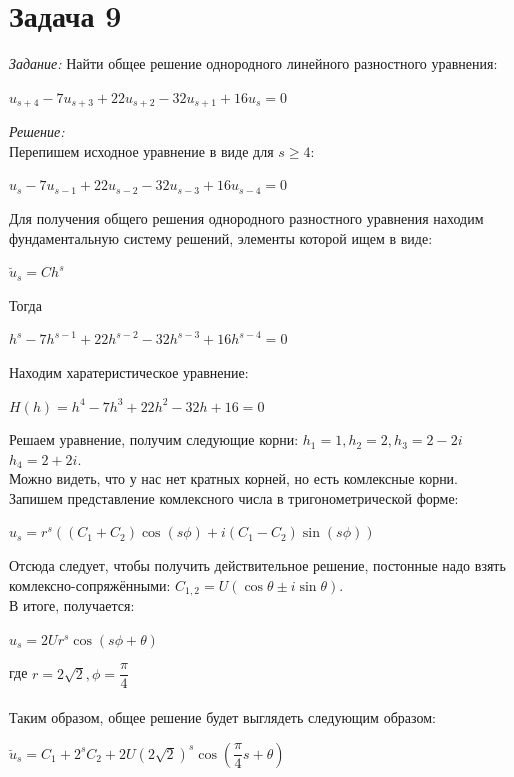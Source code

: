 \documentclass[14pt,fleqn]{extarticle}
\begin{document}
	\section*{Задача 9}
	\textit{Задание:} Найти общее решение однородного линейного разностного уравнения:
	\begin{center}
		$u_{s+4} - 7u_{s+3} + 22u_{s+2} - 32u_{s+1} + 16u_s = 0$
	\end{center}

	\textit{Решение:}\\
	Перепишем исходное уравнение в виде для $s \geq 4$:
	\begin{center}
		$u_{s} - 7u_{s-1} + 22u_{s-2} - 32u_{s-3} + 16u_{s-4} = 0$
	\end{center}
	Для получения общего решения однородного разностного уравнения находим фундаментальную систему решений, элементы которой ищем в виде:
	\begin{center}
		$\breve{u}_s = Ch^s$
	\end{center}
	Тогда
	\begin{center}
		$h^s - 7h^{s-1} + 22h^{s-2} - 32h^{s-3} + 16h^{s-4} = 0$
	\end{center}
	Находим харатеристическое уравнение:
	\begin{center}
		$H(h) = h^4 - 7h^3 + 22h^2 - 32h + 16 = 0$
	\end{center}
	Решаем уравнение, получим следующие корни: $h_1 = 1, h_2 = 2, h_3 = 2-2i$\\$h_4 = 2+2i$.\\
	Можно видеть, что у нас нет кратных корней, но есть комлексные корни. Запишем представление комлексного числа в тригонометрической форме:
	\begin{center}
		$\hat{u}_s = r^s((C_1+C_2)\cos(s\phi)+i(C_1-C_2)\sin(s\phi))$
	\end{center}
	Отсюда следует, чтобы получить действительное решение, постонные надо взять комлексно-сопряжёнными: $C_{1,2} = U(\cos\theta \pm i\sin\theta)$.\\
	В итоге, получается:
	\begin{center}
		$\hat{u}_s = 2Ur^s\cos(s\phi+\theta)$
	\end{center}
	где $r = 2\sqrt{2}, \phi = \dfrac{\pi}{4}$\\\\
	Таким образом, общее решение будет выглядеть следующим образом:
	\begin{center}
		$\breve{u}_s = C_1 + 2^sC_2 + 2U(2\sqrt{2})^s\cos(\dfrac{\pi}{4}s+\theta)$
	\end{center}
\end{document}
